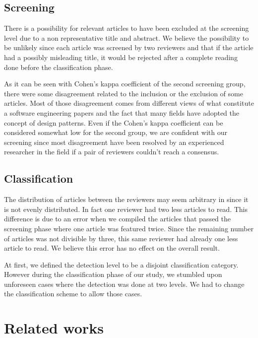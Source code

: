 \documentclass[letterpaper, 10 pt, conference]{ieeeconf}  %
\begin{document}
\subsection{Screening}

There is a possibility for relevant articles to have been excluded at the
screening level due to a non representative title and abstract.
We believe the possibility to be unlikely since each article was screened by
two reviewers and that if the article had a possibly misleading title, it would
be rejected after a complete reading done before the classification phase.

As it can be seen with Cohen's kappa coefficient of the second screening group,
there were some disagreement related to the inclusion or the exclusion of some
articles.
Most of those disagreement comes from different views of what constitute a
software engineering papers and the fact that many fields have adopted the
concept of design patterns.
Even if the Cohen's kappa coefficient can be considered somewhat low for the
second group, we are confident with our screening since most disagreement have
been resolved by an experienced researcher in the field if a pair of reviewers
couldn't reach a consensus.


\subsection{Classification}

The distribution of articles between the reviewers may seem arbitrary in since it is not evenly distributed.
In fact one reviewer had two less articles to read.
This difference is due to an error when we compiled the articles that passed
the screening phase where one article was featured twice.
Since the remaining number of articles was not divisible by three, this same
reviewer had already one less article to read.
We believe this error has no effect on the overall result.

At first, we defined the detection level to be a disjoint classification
category.
However during the classification phase of our study, we stumbled upon
unforeseen cases where the detection was done at two levels.
We had to change the classification scheme to allow those cases.



\section{Related works}
\end{document}
